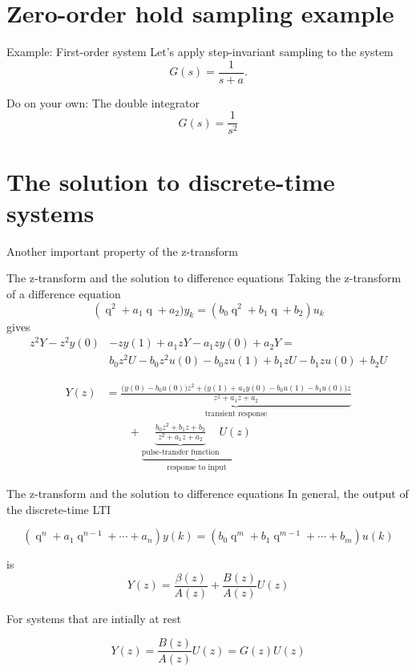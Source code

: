 \documentclass[presentation,aspectratio=169]{beamer}
\DeclareMathOperator{\shift}{q}
\begin{document}
\section{Zero-order hold sampling example}
\label{sec-5}
\begin{frame}[label=sec-5-1]{Example: First-order system}
Let's apply step-invariant sampling to the system
\[ G(s) = \frac{1}{s + a}. \]
\end{frame}

\begin{frame}[label=sec-5-2]{Do on your own: The double integrator}
\[ G(s) = \frac{1}{s^2} \]
\end{frame}

\section{The solution to discrete-time systems}
\label{sec-6}
\begin{frame}[label=sec-6-1]{Another important property of the z-transform}
\end{frame}


\begin{frame}[label=sec-6-2]{The z-transform and the solution to difference equations}
Taking the z-transform of a difference equation 
\[ \left( \shift^2 + a_1\shift + a_2) y_k = \left(b_0\shift^2 + b_1\shift + b_2 \right) u_k\]
gives
\begin{equation*}
\begin{split}
z^{2}Y -z^2y(0) &- zy(1) + a_1zY - a_1zy(0) + a_2Y =\\
&     b_0z^2U -b_0z^2u(0) - b_0zu(1) + b_1zU - b_1zu(0) + b_2U
\end{split}
\end{equation*}

\begin{equation*}
\begin{split}
 Y(z) &= \underbrace{ \frac{ \big( y(0)-b_0u(0)\big) z^2 + \big(y(1)+a_1y(0) - b_0u(1) -b_1u(0)\big) z}{z^2 + a_1z + a_2}}_{\text{transient response}}\\
 & \qquad + \underbrace{\underbrace{\frac{b_0z^2 + b_1z + b_2}{z^2 + a_1z + a_2}}_{\text{pulse-transfer function}}U(z)}_{\text{response to input}}
\end{split}
\end{equation*}
\end{frame}

\begin{frame}[label=sec-6-3]{The z-transform and the solution to difference equations}
In general, the output of the discrete-time LTI 

\[ \left( \shift^n + a_1 \shift^{n-1} + \cdots + a_n \right) y(k) = \left( b_0 \shift^m + b_1\shift^{m-1} + \cdots + b_m \right)  u(k) \]

is
\[ Y(z) = \frac{\beta(z)}{A(z)} + \frac{B(z)}{A(z)} U(z) \]

For systems that are intially at rest

\[ Y(z) = \frac{B(z)}{A(z)} U(z)  = G(z) U(z) \]
\end{frame}
\end{document}
